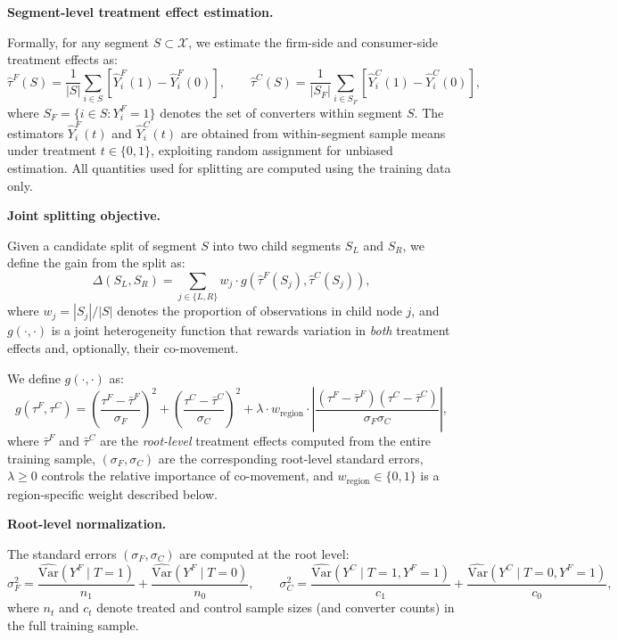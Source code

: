 \documentclass[11pt,letterpaper,english]{article}
\theoremstyle{definition}
\theoremstyle{definition}
\begin{document}
\begin{bibunit}
\vspace{6pt}

\noindent
\textbf{Segment-level treatment effect estimation.}

Formally, for any segment $S \subset \mathcal{X}$, we estimate the firm-side and consumer-side treatment effects as:
\[
\hat{\tau}^F(S) = \frac{1}{|S|} \sum_{i \in S} \left[ \hat{Y}^F_i(1) - \hat{Y}^F_i(0) \right], \qquad
\hat{\tau}^C(S) = \frac{1}{|S_F|} \sum_{i \in S_F} \left[ \hat{Y}^C_i(1) - \hat{Y}^C_i(0) \right],
\]
where $S_F = \{i \in S : Y^F_i = 1\}$ denotes the set of converters within segment $S$. The estimators $\hat{Y}^F_i(t)$ and $\hat{Y}^C_i(t)$ are obtained from within-segment sample means under treatment $t \in \{0,1\}$, exploiting random assignment for unbiased estimation. All quantities used for splitting are computed using the training data only.

\vspace{6pt}

\noindent
\textbf{Joint splitting objective.}

Given a candidate split of segment $S$ into two child segments $S_L$ and $S_R$, we define the gain from the split as:
\[
\Delta(S_L, S_R) =
\sum_{j \in \{L,R\}} w_j \cdot g\!\left( \hat{\tau}^F(S_j), \hat{\tau}^C(S_j) \right),
\]
where $w_j = |S_j|/|S|$ denotes the proportion of observations in child node $j$, and $g(\cdot,\cdot)$ is a joint heterogeneity function that rewards variation in \emph{both} treatment effects and, optionally, their co-movement.

We define $g(\cdot,\cdot)$ as:
\[
g\!\left( \tau^F, \tau^C \right)
=
\left( \frac{\tau^F - \bar{\tau}^F}{\sigma_F} \right)^2
+
\left( \frac{\tau^C - \bar{\tau}^C}{\sigma_C} \right)^2
+
\lambda \cdot w_{\text{region}} \cdot
\left|
\frac{(\tau^F - \bar{\tau}^F)(\tau^C - \bar{\tau}^C)}{\sigma_F \sigma_C}
\right|,
\]
where $\bar{\tau}^F$ and $\bar{\tau}^C$ are the \emph{root-level} treatment effects computed from the entire training sample, $(\sigma_F, \sigma_C)$ are the corresponding root-level standard errors, $\lambda \geq 0$ controls the relative importance of co-movement, and $w_{\text{region}} \in \{0,1\}$ is a region-specific weight described below.

\vspace{6pt}

\noindent
\textbf{Root-level normalization.}

The standard errors $(\sigma_F, \sigma_C)$ are computed at the root level:
\[
\sigma_F^2 =
\frac{\widehat{\mathrm{Var}}(Y^F \mid T=1)}{n_1}
+
\frac{\widehat{\mathrm{Var}}(Y^F \mid T=0)}{n_0},
\qquad
\sigma_C^2 =
\frac{\widehat{\mathrm{Var}}(Y^C \mid T=1, Y^F=1)}{c_1}
+
\frac{\widehat{\mathrm{Var}}(Y^C \mid T=0, Y^F=1)}{c_0},
\]
where $n_t$ and $c_t$ denote treated and control sample sizes (and converter counts) in the full training sample.


\end{bibunit}
\end{document}
